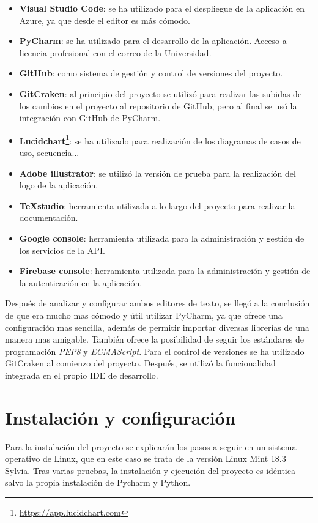\begin{itemize}
	\item \textbf{Visual Studio Code}: se ha utilizado para el despliegue de la aplicación en Azure, ya que desde el editor es más cómodo.
	\item \textbf{PyCharm}: se ha utilizado para el desarrollo de la aplicación. Acceso a licencia profesional con el correo de la Universidad.
	\item \textbf{GitHub}: como sistema de gestión y control de versiones del proyecto.
	\item \textbf{GitCraken}: al principio del proyecto se utilizó para realizar las subidas de los cambios en el proyecto al repositorio de GitHub, pero al final se usó la integración con GitHub de PyCharm.
	\item \textbf{Lucidchart}\footnote{\url{https://app.lucidchart.com}}: se ha utilizado para realización de los diagramas de casos de uso, secuencia...
	\item \textbf{Adobe illustrator}: se utilizó la versión de prueba para la realización del logo de la aplicación.
	\item \textbf{TeXstudio}: herramienta utilizada a lo largo del proyecto para realizar la documentación.
	\item \textbf{Google console}: herramienta utilizada para la administración y gestión de los servicios de la API.
	\item \textbf{Firebase console}: herramienta utilizada para la administración y gestión de la autenticación en la aplicación.
\end{itemize}
Después de analizar y configurar ambos editores de texto, se llegó a la conclusión de que era mucho mas cómodo y útil utilizar PyCharm, ya que ofrece una configuración mas sencilla, además de permitir importar diversas librerías de una manera mas amigable. También ofrece la posibilidad de seguir los estándares de programación \textit{PEP8} y \textit{ECMAScript}.
Para el control de versiones se ha utilizado GitCraken al comienzo del proyecto. Después, se utilizó la funcionalidad integrada en el propio IDE de desarrollo.


\section{Instalación y configuración}
Para la instalación del proyecto se explicarán los pasos a seguir en un sistema operativo de Linux, que en este caso se trata de la versión Linux Mint 18.3 Sylvia.
Tras varias pruebas, la instalación y ejecución del proyecto es idéntica salvo la propia instalación de Pycharm y Python.


